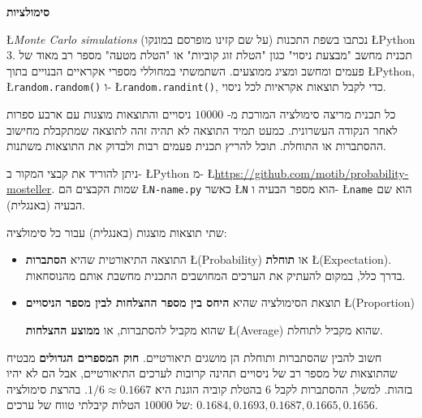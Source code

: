 \textbf{סימולציות}

\L{\emph{Monte Carlo simulations}}
(על שם קזינו מופרסם במונקו) נכתבו בשפת התכנות
\L{Python 3}.
תכנית מחשב "מבצעת ניסוי" כגון "הטלת זוג קוביות" או "הטלת מטעה" מספר רב מאוד של פעמים ומחשב ומציג ממוצעים. השתמשתי במחוללי מספרי אקראיים הבנויים בתוך
\L{Python},
\L{\texttt{random.random()}}
ו-%
\L{\texttt{random.randint()}},
כדי לקבל תוצאות אקראיות לכל ניסוי.

כל תכנית מריצה סימולציה המורכת מ-%
$10000$
ניסויים והתוצאות מוצגות עם ארבע ספרות לאחר הנקודה העשרונית. כמעט תמיד התוצאה לא תהיה זהה לתוצאה שמתקבלת מחישוב ההסתברות או התוחלת. תוכל להריץ תכנית פעמים רבות ולבדוק את התוצאות משתנות.

ניתן להוריד את קבצי המקור ב-%
\L{Python}
מ-%
\L{\url{https://github.com/motib/probability-mosteller}}.
שמות הקבצים הם 
\L{\texttt{N-name.py}}
כאשר
\L{\texttt{N}}
הוא מספר הבעיה ו-%
\L{\texttt{name}}
הוא שם הבעיה (באנגלית).

שתי תוצאות מוצגות (באנגלית) עבור כל סימולציה:
\begin{itemize}
\item
התוצאה התיאורטית שהיא 
\textbf{הסתברות}
\L{(Probability)}
או
\textbf{תוחלת}
\L{(Expectation)}.
בדרך כלל, במקום להעתיק את הערכים המחושבים התכנית מחשבת אותם מהנוסחאות.
\item
תוצאת הסימולציה שהיא
\textbf{היחס בין מספר ההצלחות לבין מספר הניסויים}
\L{(Proportion)}

שהוא מקביל להסתברות, או
\textbf{ממוצע ההצלחות}
\L{(Average)}
שהוא מקביל לתוחלת.
\end{itemize}
חשוב להבין שהסתברות ותוחלת הן מושגים תיאורטיים. 
\textbf{חוק המספרים הגדולים}
מבטיח שהתוצאות של מספר רב של ניסויים תהינה קרובות לערכים התיאורטיים, אבל הם לא יהיו בזהות. למשל, ההסתברות לקבל 
$6$
בהטלת קוביה הוגנת היא
$1/6\approx 0.1667$.
בהרצת סימולציה של 
$10000$
הטלות קיבלתי טווח של ערכים:
$0.1684, 0.1693, 0.1687, 0.1665, 0.1656$.

\newpage
